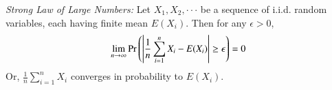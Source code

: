         \begin{lemma}
            {\em Strong Law of Large Numbers: }
            Let $X_1, X_2, \cdot \cdot \cdot$ be a sequence of i.i.d. random variables, each having finite mean $E(X_i)$. Then for any $\epsilon >0$,
            \begin{align}
                \lim_{n \to \infty}\Pr\left(\left|\dfrac{1}{n}\sum_{i=1}^nX_i - E(X_i)\right|\geq \epsilon\right)=0
            \end{align}
            Or, $\frac{1}{n}\sum_{i=1}^nX_i$ converges in probability to $E(X_i)$.
        \end{lemma}
